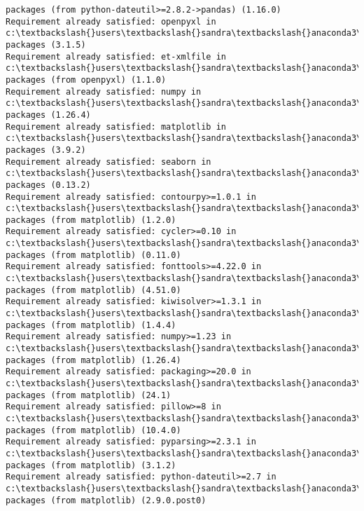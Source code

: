 \documentclass[11pt]{article}
\begin{document}
\begin{Verbatim}[commandchars=\\\{\}]
packages (from python-dateutil>=2.8.2->pandas) (1.16.0)
Requirement already satisfied: openpyxl in c:\textbackslash{}users\textbackslash{}sandra\textbackslash{}anaconda3\textbackslash{}lib\textbackslash{}site-
packages (3.1.5)
Requirement already satisfied: et-xmlfile in c:\textbackslash{}users\textbackslash{}sandra\textbackslash{}anaconda3\textbackslash{}lib\textbackslash{}site-
packages (from openpyxl) (1.1.0)
Requirement already satisfied: numpy in c:\textbackslash{}users\textbackslash{}sandra\textbackslash{}anaconda3\textbackslash{}lib\textbackslash{}site-
packages (1.26.4)
Requirement already satisfied: matplotlib in c:\textbackslash{}users\textbackslash{}sandra\textbackslash{}anaconda3\textbackslash{}lib\textbackslash{}site-
packages (3.9.2)
Requirement already satisfied: seaborn in c:\textbackslash{}users\textbackslash{}sandra\textbackslash{}anaconda3\textbackslash{}lib\textbackslash{}site-
packages (0.13.2)
Requirement already satisfied: contourpy>=1.0.1 in
c:\textbackslash{}users\textbackslash{}sandra\textbackslash{}anaconda3\textbackslash{}lib\textbackslash{}site-packages (from matplotlib) (1.2.0)
Requirement already satisfied: cycler>=0.10 in
c:\textbackslash{}users\textbackslash{}sandra\textbackslash{}anaconda3\textbackslash{}lib\textbackslash{}site-packages (from matplotlib) (0.11.0)
Requirement already satisfied: fonttools>=4.22.0 in
c:\textbackslash{}users\textbackslash{}sandra\textbackslash{}anaconda3\textbackslash{}lib\textbackslash{}site-packages (from matplotlib) (4.51.0)
Requirement already satisfied: kiwisolver>=1.3.1 in
c:\textbackslash{}users\textbackslash{}sandra\textbackslash{}anaconda3\textbackslash{}lib\textbackslash{}site-packages (from matplotlib) (1.4.4)
Requirement already satisfied: numpy>=1.23 in
c:\textbackslash{}users\textbackslash{}sandra\textbackslash{}anaconda3\textbackslash{}lib\textbackslash{}site-packages (from matplotlib) (1.26.4)
Requirement already satisfied: packaging>=20.0 in
c:\textbackslash{}users\textbackslash{}sandra\textbackslash{}anaconda3\textbackslash{}lib\textbackslash{}site-packages (from matplotlib) (24.1)
Requirement already satisfied: pillow>=8 in c:\textbackslash{}users\textbackslash{}sandra\textbackslash{}anaconda3\textbackslash{}lib\textbackslash{}site-
packages (from matplotlib) (10.4.0)
Requirement already satisfied: pyparsing>=2.3.1 in
c:\textbackslash{}users\textbackslash{}sandra\textbackslash{}anaconda3\textbackslash{}lib\textbackslash{}site-packages (from matplotlib) (3.1.2)
Requirement already satisfied: python-dateutil>=2.7 in
c:\textbackslash{}users\textbackslash{}sandra\textbackslash{}anaconda3\textbackslash{}lib\textbackslash{}site-packages (from matplotlib) (2.9.0.post0)

\end{Verbatim}
\end{document}

